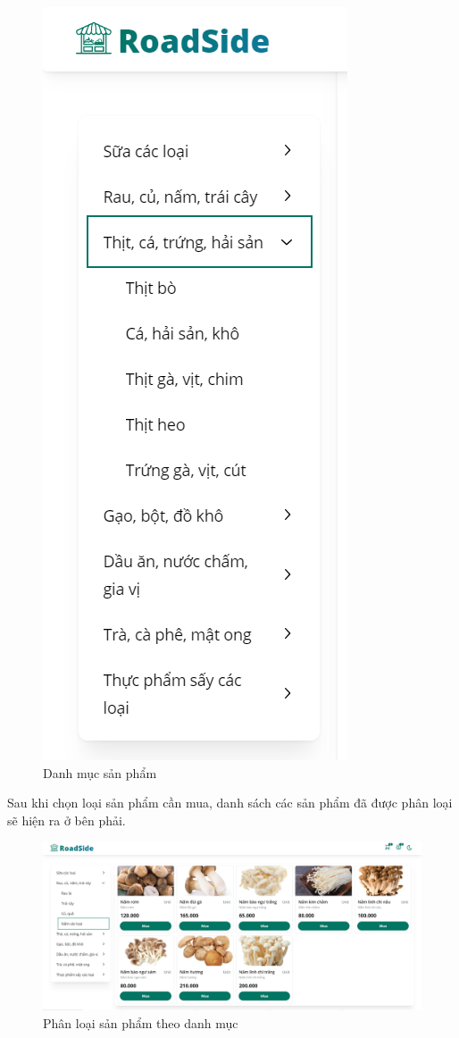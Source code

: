 \begin{figure}[H]
    \includegraphics[scale=0.7] {Images/UI/category2.png}
    \vspace{1em}
    \caption{Danh mục sản phẩm}
\end{figure}

Sau khi chọn loại sản phẩm cần mua, danh sách các sản phẩm đã được phân loại sẽ hiện ra ở bên phải.
\begin{figure}[H]
    \centering
    \includegraphics[width=1\linewidth] {Images/UI/product_category.png}
    \vspace{1em}
    \caption{Phân loại sản phẩm theo danh mục}
\end{figure}

